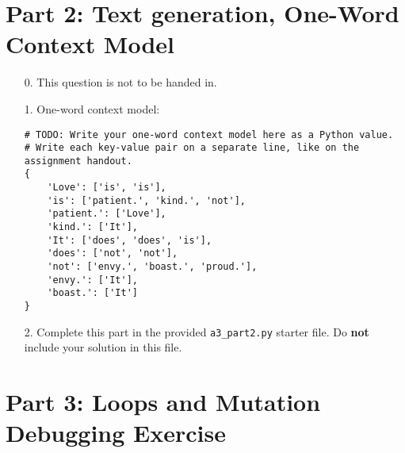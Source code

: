 \documentclass[fontsize=11pt]{article}
\begin{document}
\newpage

\section*{Part 2: Text generation, One-Word Context Model}

\begin{enumerate}

\item[0.]
This question is not to be handed in.

\item[1.]
One-word context model:

\begin{verbatim}
# TODO: Write your one-word context model here as a Python value.
# Write each key-value pair on a separate line, like on the assignment handout.
{
    'Love': ['is', 'is'],
    'is': ['patient.', 'kind.', 'not'],
    'patient.': ['Love'],
    'kind.': ['It'],
    'It': ['does', 'does', 'is'],
    'does': ['not', 'not'],
    'not': ['envy.', 'boast.', 'proud.'],
    'envy.': ['It'],
    'boast.': ['It']
}
\end{verbatim}

\item[2.]
Complete this part in the provided \texttt{a3\_part2.py} starter file.
Do \textbf{not} include your solution in this file.

\end{enumerate}

\newpage

\section*{Part 3: Loops and Mutation Debugging Exercise}
\end{document}
